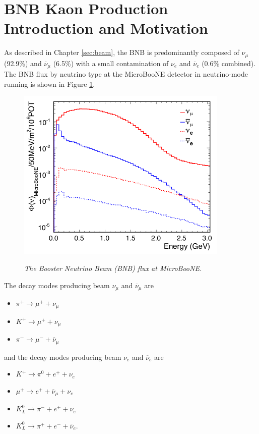 \section{BNB Kaon Production Introduction and Motivation}\label{kaon_prod_mot_sec}
As described in Chapter \ref{sec:beam}, the BNB is predominantly composed of $\nu_\mu$ (92.9\%) and $\overline{\nu}_\mu$ (6.5\%) with a small contamination of $\nu_e$ and $\overline{\nu}_e$ (0.6\% combined). The BNB flux by neutrino type at the MicroBooNE detector in neutrino-mode running is shown in Figure \ref{BNB_flux_uboone_fig}.

\begin{figure}[ht!]
\centering
	\includegraphics[width=0.9\textwidth]{Figures/BNB_flux_uboone.png} \\
\caption{\textit{The Booster Neutrino Beam (BNB) flux at MicroBooNE.}}\label{BNB_flux_uboone_fig}
\end{figure}

The decay modes producing beam $\nu_\mu$ and $\overline{\nu}_\mu$ are
\begin{itemize}
	\item $\pi^+\rightarrow\mu^++\nu_\mu$
	\item $K^+\rightarrow\mu^++\nu_\mu$
	\item $\pi^-\rightarrow\mu^-+\overline{\nu}_\mu$
\end{itemize}
and the decay modes producing beam $\nu_e$ and $\overline{\nu}_e$ are
\begin{itemize}
	\item $K^+ \rightarrow \pi^0 + e^+ + \nu_e$
	\item $\mu^+ \rightarrow e^+ + \overline{\nu}_\mu + \nu_e$
	\item $K^0_L \rightarrow \pi^- + e^+ + \nu_e$
	\item $K^0_L \rightarrow \pi^+ + e^- + \overline{\nu}_e$.
\end{itemize}

